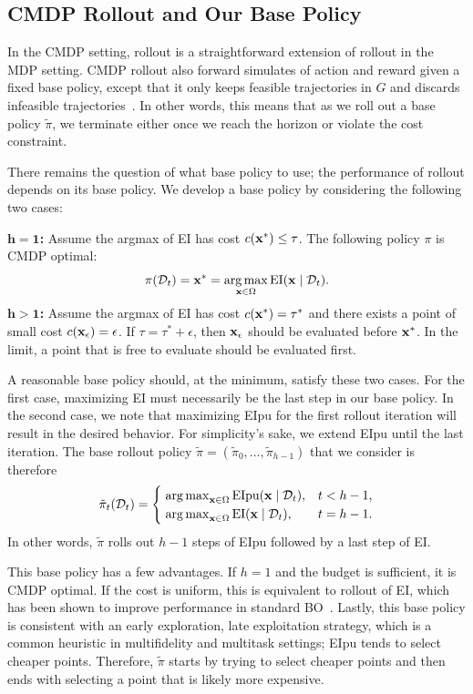 \subsection{CMDP Rollout and Our Base Policy}
In the CMDP setting, rollout is a straightforward extension of rollout in the MDP setting. CMDP rollout also forward simulates of action and reward given a fixed base policy, except that it only keeps feasible trajectories in $G$ and discards infeasible trajectories~\citep{bertsekas2005rollout}.
In other words, this means that as we roll out a base policy $\tilde \pi$, we terminate either once we reach the horizon or violate the cost constraint.

There remains the question of what base policy to use; the performance of rollout depends on its base policy. We develop a base policy by considering the following two cases:

$\mathbf{h=1}$\textbf{:} Assume the argmax of EI has cost $c({\mathbf{x}}^*) \leq \tau$. The following policy $\pi$ is CMDP optimal:
    \[
    \pi({\mathcal{D}}_t) = {\mathbf{x}}^* = \operatorname*{arg\,max}_{{\mathbf{x}} \in \Omega} {\text{EI}}({\mathbf{x}} \mid {\mathcal{D}}_t).
    \]
$\mathbf{h > 1}$\textbf{:} Assume the argmax of EI has cost $c({\mathbf{x}}^*) =\tau^*$ and there exists a point of small cost $c({\mathbf{x}}_{\epsilon}) = \epsilon$. If $ \tau = \tau^* + \epsilon$, then ${\mathbf{x}}_{\epsilon}$ should be evaluated before ${\mathbf{x}}^*$.
In the limit, a point that is free to evaluate should  be evaluated first.

A reasonable base policy should, at the minimum, satisfy these two cases.
For the first case, maximizing EI must necessarily be the last step in our base policy.
In the second case, we note that maximizing EIpu for the first rollout iteration will result in the desired behavior.
For simplicity's sake, we extend EIpu until the last iteration.
The base rollout policy $\tilde \pi = (\tilde \pi_0, \dots, \tilde \pi_{h-1})$ that we consider is therefore
\[
\tilde \pi_{t}({\mathcal{D}}_t) =
    \begin{cases}
        \; \operatorname*{arg\,max}_{{\mathbf{x}} \in \Omega} \text{EIpu}({\mathbf{x}} \mid {\mathcal{D}}_{t}), & t < h-1,\\
        \; \operatorname*{arg\,max}_{{\mathbf{x}} \in \Omega} \text{EI}({\mathbf{x}} \mid {\mathcal{D}}_{t}), & t = h-1.
    \end{cases}
\]
In other words, $\tilde \pi$ rolls out $h-1$ steps of EIpu followed by a last step of EI.

This base policy has a few advantages. If $h=1$ and the budget is sufficient, it is CMDP optimal. If the cost is uniform, this is equivalent to rollout of EI, which has been shown to improve performance in standard BO~\citep{wu2019practical, lee2020efficient}.
Lastly, this base policy is consistent with an early exploration, late exploitation strategy, which is a common heuristic in multifidelity and multitask settings; EIpu tends to select cheaper points.
Therefore, $\tilde \pi$ starts by trying to select cheaper points and then ends with selecting a point that is likely more expensive.



